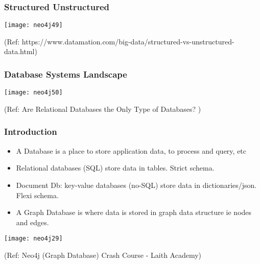 \begin{frame}\frametitle{Structured Unstructured}


\begin{center}
\texttt{[image: neo4j49]}
\end{center}	

{\tiny (Ref: https://www.datamation.com/big-data/structured-vs-unstructured-data.html)}
\end{frame}



\begin{frame}\frametitle{Database Systems Landscape }


\begin{center}
\texttt{[image: neo4j50]}
\end{center}	

{\tiny (Ref: Are Relational Databases the Only Type of Databases? )}

\end{frame}



\begin{frame}\frametitle{Introduction}

\begin{itemize}
\item A Database is a place to store application data, to process and query, etc

\item Relational databases (SQL) store data in tables. Strict schema.
\item Document Db: key-value databases (no-SQL) store data in dictionaries/json. Flexi schema.
\item A Graph Database is where data is stored in graph data structure ie nodes and edges.
\end{itemize}

\begin{center}
\texttt{[image: neo4j29]}
\end{center}	

{\tiny (Ref: Neo4j (Graph Database) Crash Course - Laith Academy)}
\end{frame}


